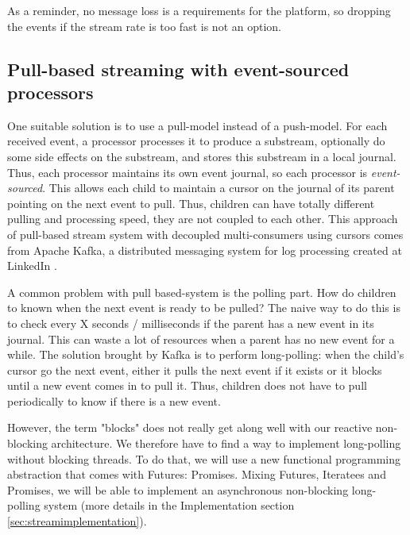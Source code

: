 As a reminder, no message loss is a requirements for the platform, so dropping the events if the stream rate is too fast is not an option.
\\

\subsection{Pull-based streaming with event-sourced processors}

One suitable solution is to use a pull-model instead of a push-model. For each received event, a processor processes it to produce a substream, optionally do some
side effects on the substream, and stores this substream in a local journal. Thus, each processor maintains its own event journal, so each processor is \textit{event-sourced}.
This allows each child to maintain a cursor on the journal of its parent pointing on the next event to pull. Thus, children can have totally different pulling and processing speed, they are not coupled to each other. This approach of pull-based stream system with decoupled multi-consumers using cursors comes from Apache Kafka, a distributed messaging system for log processing created at LinkedIn . 

A common problem with pull based-system is the polling part. How do children to known when the next event is ready to be pulled? The naive way to do this is to check every X seconds / milliseconds if the parent has a new event in its journal. This can waste a lot of resources when a parent has no new event for a while. The solution brought by Kafka is to 
perform long-polling: when the child's cursor go the next event, either it pulls the next event if it exists or it blocks until a new event comes in to pull it. Thus, children does not have to pull periodically to know if there is a new event.

However, the term "blocks" does not really get along well with our reactive non-blocking architecture. We therefore have to find a way to implement long-polling without blocking
threads. To do that, we will use a new functional programming abstraction that comes with Futures: Promises. Mixing Futures, Iteratees and Promises, we will be able to implement
an asynchronous non-blocking long-polling system (more details in the Implementation section \ref{sec:streamimplementation}).

